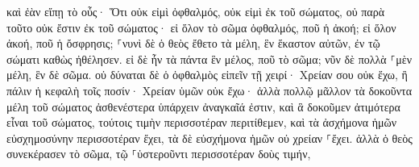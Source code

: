 \documentclass{openreader}
\begin{document}
καὶ ἐὰν εἴπῃ τὸ οὖς· Ὅτι οὐκ εἰμὶ ὀφθαλμός, οὐκ εἰμὶ ἐκ τοῦ σώματος, οὐ παρὰ τοῦτο οὐκ ἔστιν ἐκ τοῦ σώματος· 
εἰ ὅλον τὸ σῶμα ὀφθαλμός, ποῦ ἡ ἀκοή; εἰ ὅλον ἀκοή, ποῦ ἡ ὄσφρησις; 
⸀νυνὶ δὲ ὁ θεὸς ἔθετο τὰ μέλη, ἓν ἕκαστον αὐτῶν, ἐν τῷ σώματι καθὼς ἠθέλησεν. 
εἰ δὲ ἦν τὰ πάντα ἓν μέλος, ποῦ τὸ σῶμα; 
νῦν δὲ πολλὰ ⸀μὲν μέλη, ἓν δὲ σῶμα. 
οὐ δύναται δὲ ὁ ὀφθαλμὸς εἰπεῖν τῇ χειρί· Χρείαν σου οὐκ ἔχω, ἢ πάλιν ἡ κεφαλὴ τοῖς ποσίν· Χρείαν ὑμῶν οὐκ ἔχω· 
ἀλλὰ πολλῷ μᾶλλον τὰ δοκοῦντα μέλη τοῦ σώματος ἀσθενέστερα ὑπάρχειν ἀναγκαῖά ἐστιν, 
καὶ ἃ δοκοῦμεν ἀτιμότερα εἶναι τοῦ σώματος, τούτοις τιμὴν περισσοτέραν περιτίθεμεν, καὶ τὰ ἀσχήμονα ἡμῶν εὐσχημοσύνην περισσοτέραν ἔχει, 
τὰ δὲ εὐσχήμονα ἡμῶν οὐ χρείαν ⸀ἔχει. ἀλλὰ ὁ θεὸς συνεκέρασεν τὸ σῶμα, τῷ ⸀ὑστεροῦντι περισσοτέραν δοὺς τιμήν, 
\end{document}
